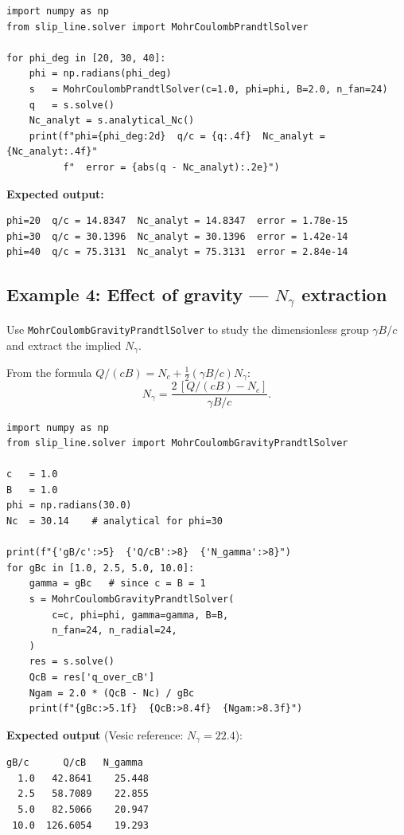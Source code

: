 \documentclass[11pt,a4paper]{article}
\newcommand{\Nc}{N_c}
\newcommand{\Ngamma}{N_\gamma}
\begin{document}
\begin{lstlisting}
import numpy as np
from slip_line.solver import MohrCoulombPrandtlSolver

for phi_deg in [20, 30, 40]:
    phi = np.radians(phi_deg)
    s   = MohrCoulombPrandtlSolver(c=1.0, phi=phi, B=2.0, n_fan=24)
    q   = s.solve()
    Nc_analyt = s.analytical_Nc()
    print(f"phi={phi_deg:2d}  q/c = {q:.4f}  Nc_analyt = {Nc_analyt:.4f}"
          f"  error = {abs(q - Nc_analyt):.2e}")
\end{lstlisting}

\textbf{Expected output:}
\begin{lstlisting}[numbers=none]
phi=20  q/c = 14.8347  Nc_analyt = 14.8347  error = 1.78e-15
phi=30  q/c = 30.1396  Nc_analyt = 30.1396  error = 1.42e-14
phi=40  q/c = 75.3131  Nc_analyt = 75.3131  error = 2.84e-14
\end{lstlisting}

\subsection{Example 4: Effect of gravity — $N_\gamma$ extraction}
\label{ex:gravity}

Use \texttt{MohrCoulombGravityPrandtlSolver} to study the
dimensionless group $\gamma B/c$ and extract the implied $\Ngamma$.

From the formula $Q/(cB) = \Nc + \frac{1}{2}(\gamma B/c)\Ngamma$:
\begin{equation}
  \Ngamma = \frac{2\,[Q/(cB) - \Nc]}{\gamma B / c}.
\end{equation}

\begin{lstlisting}
import numpy as np
from slip_line.solver import MohrCoulombGravityPrandtlSolver

c   = 1.0
B   = 1.0
phi = np.radians(30.0)
Nc  = 30.14    # analytical for phi=30

print(f"{'gB/c':>5}  {'Q/cB':>8}  {'N_gamma':>8}")
for gBc in [1.0, 2.5, 5.0, 10.0]:
    gamma = gBc   # since c = B = 1
    s = MohrCoulombGravityPrandtlSolver(
        c=c, phi=phi, gamma=gamma, B=B,
        n_fan=24, n_radial=24,
    )
    res = s.solve()
    QcB = res['q_over_cB']
    Ngam = 2.0 * (QcB - Nc) / gBc
    print(f"{gBc:>5.1f}  {QcB:>8.4f}  {Ngam:>8.3f}")
\end{lstlisting}

\textbf{Expected output} (Vesic reference: $\Ngamma = 22.4$):
\begin{lstlisting}[numbers=none]
 gB/c      Q/cB   N_gamma
  1.0   42.8641    25.448
  2.5   58.7089    22.855
  5.0   82.5066    20.947
 10.0  126.6054    19.293
\end{lstlisting}
\end{document}
